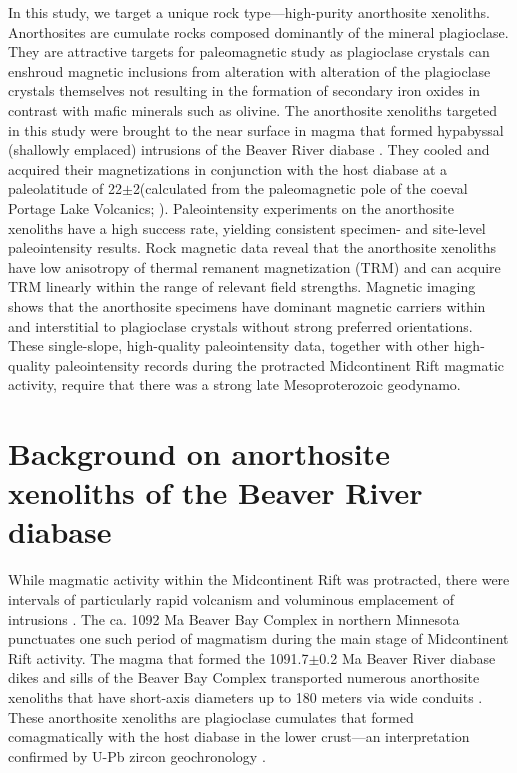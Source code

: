 \documentclass[9pt,twocolumn,twoside,lineno]{pnas-new}
\begin{document}
In this study, we target a unique rock type---high-purity anorthosite xenoliths. Anorthosites are cumulate rocks composed dominantly of the mineral plagioclase. They are attractive targets for paleomagnetic study as plagioclase crystals can enshroud magnetic inclusions from alteration with alteration of the plagioclase crystals themselves not resulting in the formation of secondary iron oxides in contrast with mafic minerals such as olivine. The anorthosite xenoliths targeted in this study were brought to the near surface in magma that formed hypabyssal (shallowly emplaced) intrusions of the Beaver River diabase \cite{Zhang2021b}. They cooled and acquired their magnetizations in conjunction with the host diabase at a paleolatitude of 22\textdegree $\pm$2\textdegree (calculated from the paleomagnetic pole of the coeval Portage Lake Volcanics; \citealp{Swanson-Hysell2019a, Zhang2021b}). Paleointensity experiments on the anorthosite xenoliths have a high success rate, yielding consistent specimen- and site-level paleointensity results. Rock magnetic data reveal that the anorthosite xenoliths have low anisotropy of thermal remanent magnetization (TRM) and can acquire TRM linearly within the range of relevant field strengths. Magnetic imaging shows that the anorthosite specimens have dominant magnetic carriers within and interstitial to plagioclase crystals without strong preferred orientations. These single-slope, high-quality paleointensity data, together with other high-quality paleointensity records during the protracted Midcontinent Rift magmatic activity, require that there was a strong late Mesoproterozoic geodynamo.

\section*{Background on anorthosite xenoliths of the Beaver River diabase}

While magmatic activity within the Midcontinent Rift was protracted, there were intervals of particularly rapid volcanism and voluminous emplacement of intrusions \cite{Swanson-Hysell2021a}. The ca. 1092 Ma Beaver Bay Complex in northern Minnesota punctuates one such period of magmatism during the main stage of Midcontinent Rift activity. The magma that formed the 1091.7$\pm$0.2 Ma Beaver River diabase dikes and sills of the Beaver Bay Complex transported numerous anorthosite xenoliths that have short-axis diameters up to 180 meters via wide conduits \cite{Boerboom2004a, Boerboom2006b}. These anorthosite xenoliths are plagioclase cumulates that formed comagmatically with the host diabase in the lower crust---an interpretation confirmed by U-Pb zircon geochronology \cite{Zhang2021b}. 
\end{document}
